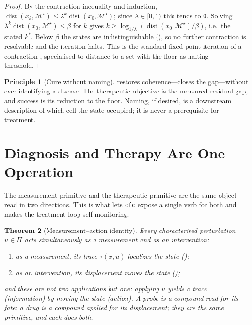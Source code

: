 \documentclass[11pt,a4paper]{article}
\theoremstyle{cfcthm}
\newtheorem{theorem}{Theorem}[section]
\theoremstyle{definition}
\newtheorem{principle}[theorem]{Principle}
\theoremstyle{remark}
\newcommand{\Man}{\mathcal{M}}          %
\newcommand{\st}{x}                     %
\newcommand{\Coh}{\Man^{\star}}         %
\newcommand{\flo}{\beta}                %
\newcommand{\Probe}{\Pi}                %
\newcommand{\trace}{\tau}               %
\newcommand{\intv}{u}                   %
\newcommand{\dist}{\operatorname{dist}}
\newcommand{\cf}[1]{\texttt{#1}}
\begin{document}
\begin{proof}
By the contraction inequality and induction,
$\dist(\st_k,\Coh)\le\lambda^{k}\dist(\st_0,\Coh)$; since $\lambda\in[0,1)$ this
tends to $0$. Solving $\lambda^{k}\dist(\st_0,\Coh)\le\flo$ for $k$ gives
$k\ge\log_{1/\lambda}(\dist(\st_0,\Coh)/\flo)$, i.e.\ the stated $k^{\ast}$.
Below $\flo$ the states are indistinguishable (), so no
further contraction is resolvable and the iteration halts. This is the standard
fixed-point iteration of a contraction \citep{banach1922}, specialised to
distance-to-a-set with the floor as halting threshold.
\end{proof}

\begin{principle}[Cure without naming]
\label{prin:cure}
 restores coherence---closes the gap---without ever
identifying a disease. The therapeutic objective is the measured residual gap,
and success is its reduction to the floor. Naming, if desired, is a downstream
description of which cell the state occupied; it is never a prerequisite for
treatment.
\end{principle}

\section{Diagnosis and Therapy Are One Operation}
\label{sec:unity}

The measurement primitive and the therapeutic primitive are the same object
read in two directions. This is what lets \cf{cfc} expose a single verb for
both and makes the treatment loop self-monitoring.

\begin{theorem}[Measurement--action identity]
\label{thm:unity}
Every characterised perturbation $\intv\in\Probe$ acts simultaneously as a
measurement and as an intervention:
\begin{enumerate}[label=\textup{(\roman*)},leftmargin=2.2em,itemsep=2pt]
\item as a \emph{measurement}, its trace $\trace(\st,\intv)$ localizes the
state ();
\item as an \emph{intervention}, its displacement moves the state
();
\end{enumerate}
and these are not two applications but one: applying $\intv$ yields a trace
(information) \emph{by} moving the state (action). A probe is a compound read
for its fate; a drug is a compound applied for its displacement; they are the
same primitive, and each does both.
\end{theorem}
\end{document}
